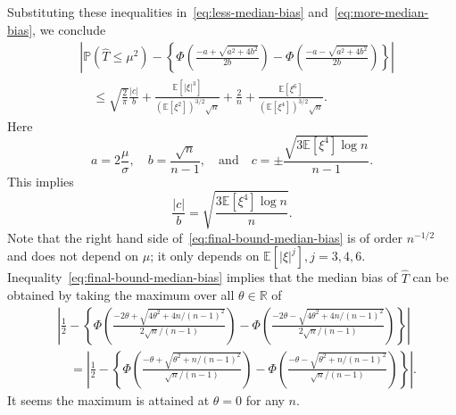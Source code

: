 \documentclass{article}
\numberwithin{myalgctr}{section}
\begin{document}
Substituting these inequalities in~\eqref{eq:less-median-bias} and~\eqref{eq:more-median-bias}, we conclude
\begin{equation}\label{eq:final-bound-median-bias}
\begin{split}
&\left|\mathbb{P}(\widehat{T} \le \mu^2) - \left\{\Phi\left(\frac{-a + \sqrt{a^2 + 4b^2}}{2b}\right) - \Phi\left(\frac{-a-\sqrt{a^2 + 4b^2}}{2b}\right)\right\}\right|\\ 
&\quad\le \sqrt{\frac{2}{\pi}}\frac{|c|}{b} + \frac{\mathbb{E}[|\xi|^3]}{(\mathbb{E}[\xi^2])^{3/2}\sqrt{n}} + \frac{2}{n} + \frac{\mathbb{E}[\xi^6]}{(\mathbb{E}[\xi^4])^{3/2}\sqrt{n}}.
\end{split}
\end{equation}
Here 
\[
a = 2\frac{\mu}{\sigma},\quad b = \frac{\sqrt{n}}{n-1},\quad\mbox{and}\quad c = \pm\frac{\sqrt{3\mathbb{E}[\xi^4]\log n}}{n-1}.
\]
This implies
\[
\frac{|c|}{b} = \sqrt{\frac{3\mathbb{E}[\xi^4]\log n}{n}}.
\]
Note that the right hand side of~\eqref{eq:final-bound-median-bias} is of order $n^{-1/2}$ and does not depend on $\mu$; it only depends on $\mathbb{E}[|\xi|^j], j = 3, 4, 6$. Inequality~\eqref{eq:final-bound-median-bias} implies that the median bias of $\widehat{T}$ can be obtained by taking the maximum over all $\theta\in\mathbb{R}$ of
\begin{align*}
&\left|\frac{1}{2} - \left\{\Phi\left(\frac{-2\theta + \sqrt{4\theta^2 + 4n/(n-1)^2}}{2\sqrt{n}/(n-1)}\right) - \Phi\left(\frac{-2\theta-\sqrt{4\theta^2 + 4n/(n-1)^2}}{2\sqrt{n}/(n-1)}\right)\right\}\right|\\
&\quad= \left|\frac{1}{2} - \left\{\Phi\left(\frac{-\theta + \sqrt{\theta^2 + n/(n-1)^2}}{\sqrt{n}/(n-1)}\right) - \Phi\left(\frac{-\theta-\sqrt{\theta^2 + n/(n-1)^2}}{\sqrt{n}/(n-1)}\right)\right\}\right|.
\end{align*}
It seems the maximum is attained at $\theta = 0$ for any $n$. 
\end{document}
